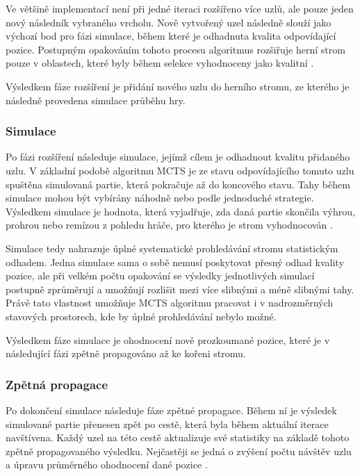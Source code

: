 Ve většině implementací není při jedné iteraci rozšířeno více uzlů, ale pouze jeden nový následník vybraného vrcholu. Nově 
vytvořený uzel následně slouží jako výchozí bod pro fázi simulace, během které je odhadnuta kvalita odpovídající pozice. 
Postupným opakováním tohoto procesu algoritmus rozšiřuje herní strom pouze v oblastech, které byly během selekce vyhodnoceny 
jako kvalitní \cite{browne2012mcts}.

Výsledkem fáze rozšíření je přidání nového uzlu do herního stromu, ze kterého je následně provedena simulace průběhu hry.

\subsubsection{Simulace}

Po fázi rozšíření následuje simulace, jejímž cílem je odhadnout kvalitu přidaného uzlu. V základní podobě 
algoritmu MCTS je ze stavu odpovídajícího tomuto uzlu spuštěna simulovaná partie, která pokračuje až do koncového
stavu. Tahy během simulace mohou být vybírány náhodně nebo podle jednoduché strategie. Výsledkem simulace je 
hodnota, která vyjadřuje, zda daná partie skončila výhrou, prohrou nebo remízou z pohledu hráče, pro kterého je strom vyhodnocován \cite{browne2012mcts}.

Simulace tedy nahrazuje úplné systematické prohledávání stromu statistickým odhadem. Jedna simulace sama o sobě nemusí 
poskytovat přesný odhad kvality pozice, ale při velkém počtu opakování se výsledky jednotlivých simulací postupně zprůměrují 
a umožňují rozlišit mezi více slibnými a méně slibnými tahy. Právě tato vlastnost umožňuje MCTS algoritmu pracovat i v nadrozměrných 
stavových prostorech, kde by úplné prohledávání nebylo možné.

Výsledkem fáze simulace je ohodnocení nově prozkoumané pozice, které je v následující fázi zpětně propagováno až ke kořeni stromu.

\subsubsection{Zpětná propagace}

Po dokončení simulace následuje fáze zpětné propagace. Během ní je výsledek simulované partie přenesen zpět po cestě, která 
byla během aktuální iterace navštívena. Každý uzel na této cestě aktualizuje své statistiky na základě tohoto zpětně propagovaného výsledku. 
Nejčastěji se jedná o zvýšení počtu návštěv uzlu a úpravu průměrného ohodnocení dané pozice \cite{browne2012mcts}.

